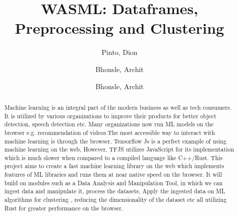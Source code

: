 \documentclass[a4paper,12pt]{report}
\title{WASML: Dataframes, Preprocessing and Clustering}
\author{
  Pinto, Dion\\
  \and
  Bhonsle, Archit\\
  \and
  Bhonsle, Archit\\
}
\begin{document}
\maketitle
\tableofcontents

\begin{abstract}
  Machine learning is an integral part of the modern business as well as
  tech consumers. It is utilized by various organizations to improve their
  products for better object detection, speech detection etc. Many
  organizations now run ML models on the browser e.g. recommendation of
  videos.The most accessible way to interact with machine learning is
  through the browser. Tensorflow Js is a perfect example of using machine
  learning on the web, However, TFJS utilizes JavaScript for its
  implementation which is much slower when compared to a compiled language
  like C++/Rust.
  This project aims to create a fast machine learning library on the web
  which implements features of ML libraries and runs them at near native
  speed on the browser. It will build on modules such as a Data Analysis
  and Manipulation Tool, in which we can ingest data and manipulate it,
  process the datasets, Apply the ingested data on ML algorithms for
  clustering , reducing the dimensionality of the dataset etc all utilizing
  Rust for greater performance on the browser.
\end{abstract}
\end{document}
